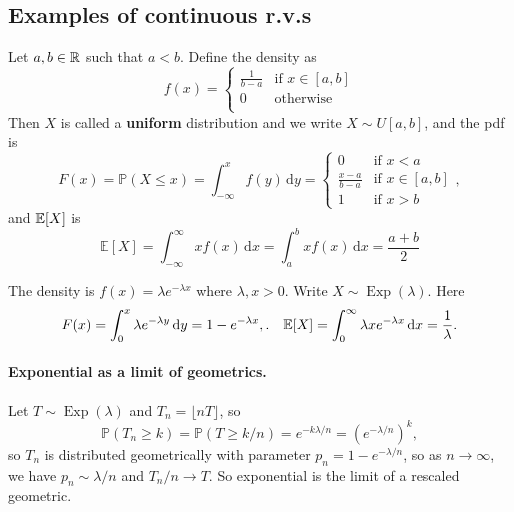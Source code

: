 \subsection{Examples of continuous r.v.s}
\begin{example}
    Let $a,b\in {\mathbb{R}}$ such that $a<b$. Define the density as 
\[
    f(x) = \begin{cases}
    \frac{1}{b-a} &\text{if }x\in [a,b]\\
    0 &\text{otherwise}\\
    \end{cases} 
\]
Then $X$ is called a \textbf{uniform} distribution and we write $ X \sim U[a,b] $, and the pdf is 
\[
    F(x)=\mathbb P(X\le x)=\int_{-\infty}^xf(y)\,\mathrm dy=\begin{cases}
        0&\text{if $x<a$}\\
        \frac{x-a}{b-a}&\text{if $x\in [a,b]$}\\
        1&\text{if $x>b$}
    \end{cases},
\]
and $ {\mathbb{E}}[X] $ is 
\[
    \mathbb E[X]=\int_{-\infty }^{\infty }xf(x)\,\mathrm dx=\int_a^bxf(x)\,\mathrm dx=\frac{a+b}{2}
\]
\end{example}

\begin{example}
    The density is $ f(x)=\lambda e^{-\lambda x} $ where $ \lambda,x>0 $. Write $ X \sim \operatorname{Exp}(\lambda) $. Here 
    \[
        F(x)=\int_0^x\lambda e^{-\lambda y}\,\mathrm dy=1-e^{-\lambda x},.\quad {\mathbb{E}}[X]=\int_{0}^{\infty} \lambda x e^{-\lambda x} \,\mathrm{d}x=\frac{1}{\lambda}.
    \]
    \paragraph{Exponential as a limit of geometrics.} Let $T\sim\operatorname{Exp}(\lambda)$ and $T_n=\lfloor nT\rfloor$, so
    \[
        \mathbb P(T_n\ge k)=\mathbb P(T\ge k/n)=e^{-k\lambda/n}=(e^{-\lambda/n})^k,
    \]
    so $T_n$ is distributed geometrically with parameter $p_n=1-e^{-\lambda/n}$, so as $n\to\infty$, we have $p_n\sim \lambda/n$ and $T_n/n\to T$. So exponential is the limit of a rescaled geometric.
\end{example}

